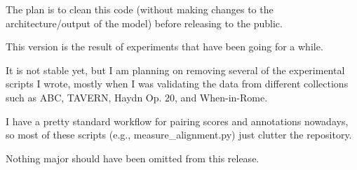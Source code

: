 The plan is to clean this code (without making changes to the architecture/output of the model) before releasing to the public.

This version is the result of experiments that have been going for a while.

It is not stable yet, but I am planning on removing several of the experimental scripts I wrote, mostly when I was validating the data from different collections such as ABC, TAVERN, Haydn Op. 20, and When-in-Rome.

I have a pretty standard workflow for pairing scores and annotations nowadays, so most of these scripts (e.g., measure\_alignment.py) just clutter the repository.

Nothing major should have been omitted from this release.
